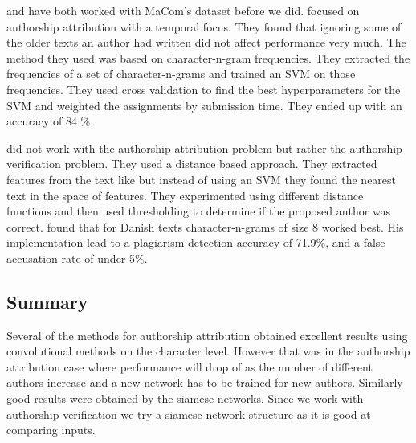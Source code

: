 \citet{hansen2014} and \citet{aalykke2016} have both worked with MaCom's dataset
before we did. \citet{hansen2014} focused on authorship attribution with a
temporal focus. They found that ignoring some of the older texts an author had
written did not affect performance very much. The method they used was based
on character-n-gram frequencies. They extracted the frequencies of a set of
character-n-grams and trained an \gls{SVM} on those frequencies. They used cross
validation to find the best hyperparameters for the \gls{SVM} and weighted the
assignments by submission time. They ended up with an accuracy of 84 \%.

\citet{aalykke2016} did not work with the authorship attribution problem but
rather the authorship verification problem. They used a distance based approach.
They extracted features from the text like \citet{hansen2014} but instead of
using an \gls{SVM} they found the nearest text in the space of features. They
experimented using different distance functions and then used thresholding to
determine if the proposed author was correct. \citet{aalykke2016} found that for
Danish texts character-n-grams of size 8 worked best. His implementation lead to
a plagiarism detection accuracy of 71.9\%, and a false accusation rate of under
5\%.

\subsection{Summary}

Several of the methods for authorship attribution obtained excellent results
using convolutional methods on the character level. However that was in the
authorship attribution case where performance will drop of as the number of
different authors increase and a new network has to be trained for new authors.
Similarly good results were obtained by the siamese networks. Since we work with
authorship verification we try a siamese network structure as it is good at
comparing inputs.
